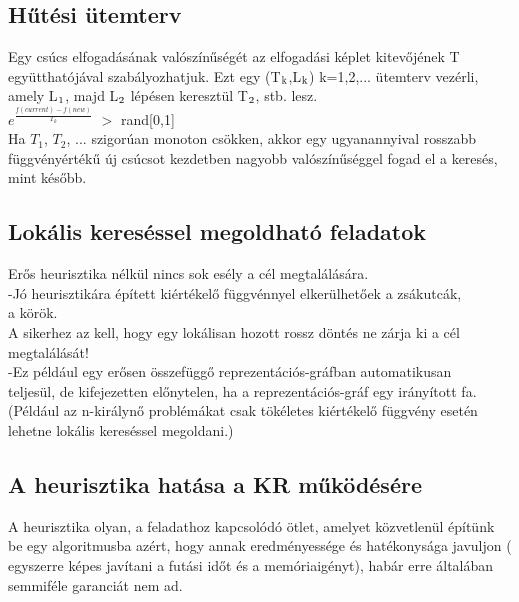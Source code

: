 \documentclass{article}
\begin{document}
	 \subsection{Hűtési ütemterv}
	 Egy csúcs elfogadásának valószínűségét az elfogadási képlet kitevőjének T együtthatójával szabályozhatjuk. Ezt egy (T$\textsubscript{k}$,L$\textsubscript{k}$) k=1,2,... ütemterv vezérli, amely L$\textsubscript{1}$, majd L$\textsubscript{2}$ lépésen keresztül T$\textsubscript{2}$, stb. lesz.\\
	 $e^\frac{f(current)-f(new)}{T_k}$ $>$ rand[0,1]\\
	 Ha $T_1$, $T_2$, ... szigorúan monoton csökken, akkor egy ugyanannyival rosszabb függvényértékű új csúcsot kezdetben nagyobb valószínűséggel fogad el a keresés, mint később.
	 
	 \subsection{Lokális kereséssel megoldható feladatok}
	 Erős heurisztika nélkül nincs sok esély a cél megtalálására.\\
	 \hspace*{0,5em} -Jó heurisztikára épített kiértékelő függvénnyel elkerülhetőek a zsákutcák,\\
	 \hspace*{0,5em} a körök.\\
	 A sikerhez az kell, hogy egy lokálisan hozott rossz döntés ne zárja ki a cél megtalálását!\\
	 \hspace*{0,5em} -Ez például egy erősen összefüggő reprezentációs-gráfban automatikusan \\
	 \hspace*{1em}teljesül, de kifejezetten előnytelen, ha a reprezentációs-gráf egy irányított fa. (Például az n-királynő problémákat csak tökéletes kiértékelő függvény esetén lehetne lokális kereséssel megoldani.)
	 
	 \subsection{A heurisztika hatása a KR működésére}
	 A heurisztika olyan, a feladathoz kapcsolódó ötlet, amelyet közvetlenül építünk be egy algoritmusba azért, hogy annak eredményessége és hatékonysága javuljon ( egyszerre képes javítani a futási időt és a memóriaigényt), habár erre általában semmiféle garanciát nem ad.
	 
\end{document}
